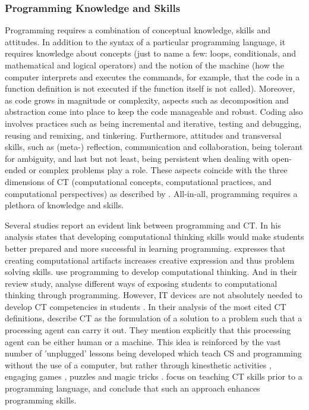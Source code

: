 \subsubsection{Programming Knowledge and Skills} \label{sec:ProgrammingKnowledgeAndSkills}

Programming requires a combination of conceptual knowledge, skills and attitudes. In addition to the syntax of a particular programming language, it requires knowledge about concepts (just to name a few: loops, conditionals, and mathematical and logical operators) and the notion of the machine (how the computer interprets and executes the commands, for example, that the code in a function definition is not executed if the function itself is not called). Moreover, as code grows in magnitude or complexity, aspects such as decomposition and abstraction come into place to keep the code manageable and robust. Coding also involves practices such as being incremental and iterative, testing and debugging, reusing and remixing, and tinkering. Furthermore, attitudes and transversal skills, such as (meta-) reflection, communication and collaboration, being tolerant for ambiguity, and last but not least, being persistent when dealing with open-ended or complex problems play a role. These aspects coincide with the three dimensions of CT (computational concepts, computational practices, and computational perspectives) as described by . All-in-all, programming requires a plethora of knowledge and skills.



Several studies report an evident link between programming and CT. In his analysis  states that developing computational thinking skills would make students better prepared and more successful in learning programming.  expresses that creating computational artifacts increases creative expression and thus problem solving skills.  use programming to develop computational thinking. And in their review study,  analyse different ways of exposing students to computational thinking through programming. However, IT devices are not absolutely needed to develop CT competencies in students \cite{corradini2017conceptions}. In their analysis of the most cited CT definitions, \citeauthor{corradini2017conceptions} describe CT as the formulation of a solution to a problem such that a processing agent can carry it out. They mention explicitly that this processing agent can be either human or a machine. This idea is reinforced by the vast number of 'unplugged' lessons being developed which teach CS and programming without the use of a computer, but rather through kinesthetic activities \cite{CSUnplugged}, engaging games \cite{CSFieldGuide}, puzzles and magic tricks \cite{curzon2009CT}.  focus on teaching CT skills prior to a programming language, and conclude that such an approach enhances programming skills.


